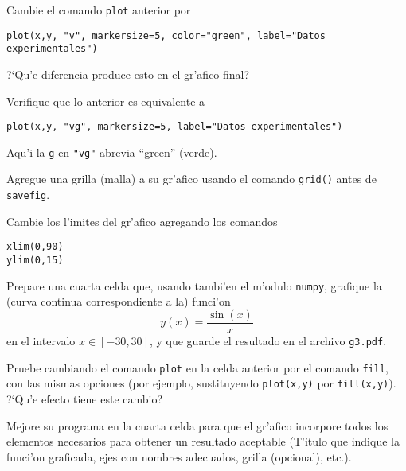 \documentclass[11pt]{exam}
\begin{document}
\begin{questions}
\item Cambie el comando \texttt{plot} anterior por 
\begin{verbatim}
plot(x,y, "v", markersize=5, color="green", label="Datos experimentales")
\end{verbatim}
?`Qu'e diferencia produce esto en el gr'afico final?
\item Verifique que lo anterior es equivalente a
\begin{verbatim}
plot(x,y, "vg", markersize=5, label="Datos experimentales")
\end{verbatim}
Aqu'i la \texttt{g} en \texttt{"vg"} abrevia ``green'' (verde).
\item Agregue una grilla (malla) a su gr'afico usando el comando \texttt{grid()} antes de \texttt{savefig}.
\item Cambie los l'imites del gr'afico agregando los comandos
\begin{verbatim}
xlim(0,90)
ylim(0,15)
\end{verbatim}
\item Prepare una cuarta celda que, usando tambi'en el m'odulo \texttt{numpy}, grafique la (curva continua correspondiente a la) funci'on
\begin{equation}
y(x)=\frac{\sin(x)}{x}
\end{equation}
en el intervalo $x\in[-30,30]$, y que guarde el resultado en el archivo \texttt{g3.pdf}.

\item Pruebe cambiando el comando \texttt{plot} en la celda anterior por el comando \texttt{fill}, con las mismas opciones (por ejemplo, sustituyendo \texttt{plot(x,y)} por \texttt{fill(x,y)}). ?`Qu'e efecto tiene este cambio?

\item Mejore su programa en la cuarta celda para que el gr'afico incorpore todos los elementos necesarios para obtener un resultado aceptable (T'itulo que indique la funci'on graficada, ejes con nombres adecuados, grilla (opcional), etc.).


\end{questions}
\end{document}
